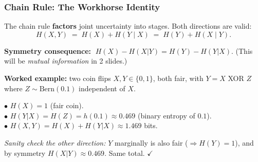 \documentclass[aspectratio=169]{beamer}
\begin{document}
\begin{frame}
\frametitle{Chain Rule: The Workhorse Identity}

\small
The chain rule \textbf{factors} joint uncertainty into stages. Both directions are valid:
\vspace{-0.1cm}
$$H(X, Y) \;=\; H(X) + H(Y \mid X) \;=\; H(Y) + H(X \mid Y).$$

\vspace{-0.1cm}
\textbf{Symmetry consequence:} $\;H(X) - H(X|Y) = H(Y) - H(Y|X)$. \;\;(This will be \emph{mutual information} in 2 slides.)

\vspace{0.15cm}
\textbf{Worked example:} two coin flips $X, Y \in \{0, 1\}$, both fair, with $Y = X$ XOR $Z$ where $Z \sim \text{Bern}(0.1)$ independent of $X$.

\vspace{0.05cm}
$\bullet$ $H(X) = 1$ \;(fair coin). \\
$\bullet$ $H(Y|X) = H(Z) = h(0.1) \approx 0.469$ \;(binary entropy of $0.1$). \\
$\bullet$ $H(X, Y) = H(X) + H(Y|X) \approx 1.469$ bits.

\vspace{0.05cm}
\textit{Sanity check the other direction:} $Y$ marginally is also fair ($\Rightarrow H(Y)=1$), and by symmetry $H(X|Y) \approx 0.469$. Same total. \;$\checkmark$

\vspace{0.1cm}
\begin{center}
\end{center}
\end{frame}
\end{document}
